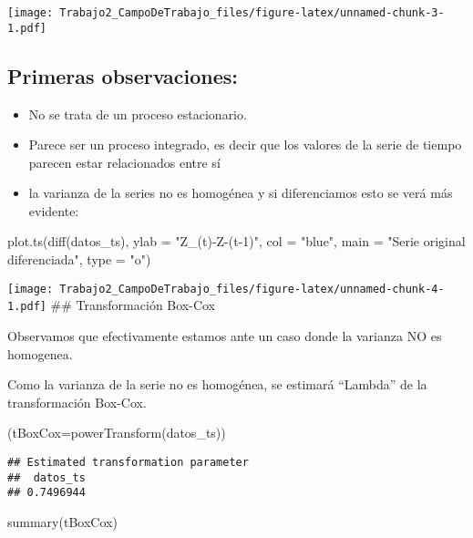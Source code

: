 \documentclass[
]{article}
\newenvironment{Shaded}{\begin{snugshade}}{\end{snugshade}}
\newcommand{\AttributeTok}[1]{\textcolor[rgb]{0.77,0.63,0.00}{#1}}
\newcommand{\FunctionTok}[1]{\textcolor[rgb]{0.00,0.00,0.00}{#1}}
\newcommand{\NormalTok}[1]{#1}
\newcommand{\StringTok}[1]{\textcolor[rgb]{0.31,0.60,0.02}{#1}}
\begin{document}
\texttt{[image: Trabajo2\_CampoDeTrabajo\_files/figure-latex/unnamed-chunk-3-1.pdf]}

\hypertarget{primeras-observaciones}{%
\subsection{Primeras observaciones:}\label{primeras-observaciones}}

\begin{itemize}
\item
  No se trata de un proceso estacionario.
\item
  Parece ser un proceso integrado, es decir que los valores de la serie
  de tiempo parecen estar relacionados entre sí
\item
  la varianza de la series no es homogénea y si diferenciamos esto se
  verá más evidente:
\end{itemize}

\begin{Shaded}
\begin{Highlighting}[]
\FunctionTok{plot.ts}\NormalTok{(}\FunctionTok{diff}\NormalTok{(datos\_ts), }\AttributeTok{ylab =} \StringTok{"Z\_(t){-}Z{-}(t{-}1)"}\NormalTok{, }\AttributeTok{col =} \StringTok{"blue"}\NormalTok{, }
        \AttributeTok{main =} \StringTok{"Serie original diferenciada"}\NormalTok{, }\AttributeTok{type =} \StringTok{"o"}\NormalTok{)}
\end{Highlighting}
\end{Shaded}

\texttt{[image: Trabajo2\_CampoDeTrabajo\_files/figure-latex/unnamed-chunk-4-1.pdf]}
\#\# Transformación Box-Cox

Observamos que efectivamente estamos ante un caso donde la varianza NO
es homogenea.

Como la varianza de la serie no es homogénea, se estimará ``Lambda'' de
la transformación Box-Cox.

\begin{Shaded}
\begin{Highlighting}[]
\NormalTok{(}\AttributeTok{tBoxCox=}\FunctionTok{powerTransform}\NormalTok{(datos\_ts))}
\end{Highlighting}
\end{Shaded}

\begin{verbatim}
## Estimated transformation parameter 
##  datos_ts 
## 0.7496944
\end{verbatim}

\begin{Shaded}
\begin{Highlighting}[]
\FunctionTok{summary}\NormalTok{(tBoxCox)}
\end{Highlighting}
\end{Shaded}
\end{document}
